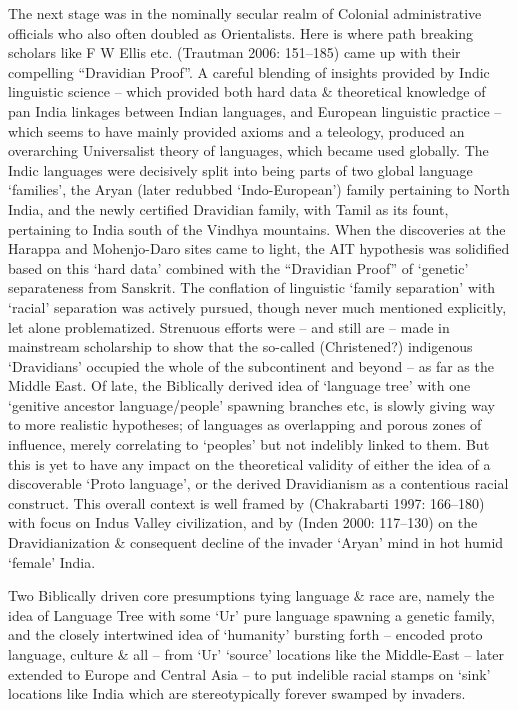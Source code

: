 The next stage was in the nominally secular realm of Colonial administrative officials who also often doubled as Orientalists. Here is where path breaking scholars like F W Ellis etc. (Trautman 2006: 151–185) came up with their compelling “Dravidian Proof”. A careful blending of insights provided by Indic linguistic science – which provided both hard data \& theoretical knowledge of pan India linkages between Indian languages, and European linguistic practice – which seems to have mainly provided axioms and a teleology, produced an overarching Universalist theory of languages, which became used globally. The Indic languages were decisively split into being parts of two global language ‘families’, the Aryan (later redubbed ‘Indo-European’) family pertaining to North India, and the newly certified Dravidian family, with Tamil as its fount, pertaining to India south of the Vindhya mountains. When the discoveries at the Harappa and Mohenjo-Daro sites came to light, the AIT hypothesis was solidified based on this ‘hard data’ combined with the “Dravidian Proof” of ‘genetic’ separateness from Sanskrit. The conflation of linguistic ‘family separation’ with ‘racial’ separation was actively pursued, though never much mentioned explicitly, let alone problematized. Strenuous efforts were – and still are – made in mainstream scholarship to show that the so-called (Christened?) indigenous ‘Dravidians’ occupied the whole of the subcontinent and beyond – as far as the Middle East. Of late, the Biblically derived idea of ‘language tree’ with one ‘genitive ancestor language/people’ spawning branches etc, is slowly giving way to more realistic hypotheses; of languages as overlapping and porous zones of influence, merely correlating to ‘peoples’ but not indelibly linked to them. But this is yet to have any impact on the theoretical validity of either the idea of a discoverable ‘Proto language’, or the derived Dravidianism as a contentious racial construct. This overall context is well framed by (Chakrabarti 1997: 166–180) with focus on Indus Valley civilization, and by (Inden 2000: 117–130) on the Dravidianization \& consequent decline of the invader ‘Aryan’ mind in hot humid ‘female’ India.

Two Biblically driven core presumptions tying language \& race are, namely the idea of Language Tree with some ‘Ur’ pure language spawning a genetic family, and the closely intertwined idea of ‘humanity’ bursting forth – encoded proto language, culture \& all – from ‘Ur’ ‘source’ locations like the Middle-East – later extended to Europe and Central Asia – to put indelible racial stamps on ‘sink’ locations like India which are stereotypically forever swamped by invaders.

